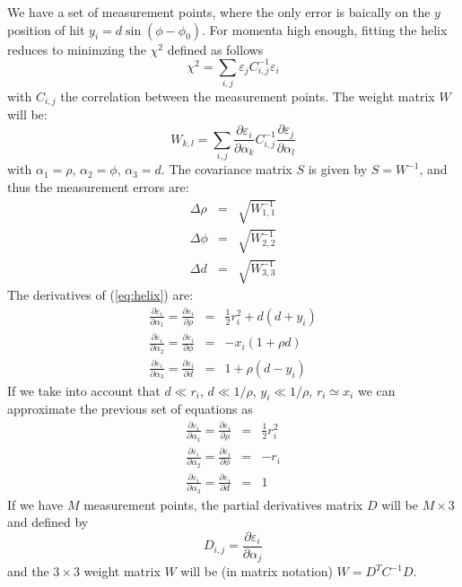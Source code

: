 \documentclass[10pt,a4paper]{article}
\begin{document}
We have a set of measurement points, where the only error is baically
on the $y$ position of hit $y_i = d \sin (\phi-\phi_0)$. For momenta
high enough, fitting the helix reduces to minimzing the $\chi^2$
defined as follows
\begin{equation}
  \chi^2 = \sum_{i,j} \varepsilon_j C^{-1}_{i,j} \varepsilon_i
\end{equation}
with $C_{i,j}$ the correlation between the measurement points. The
weight matrix $W$ will be:
\begin{equation}
  W_{k,l} = \sum_{i,j} \frac { \partial \varepsilon_i} {\partial \alpha_k} C^{-1}_{i,j}  \frac { \partial \varepsilon_j} {\partial \alpha_l}
\end{equation}
with $\alpha_1 = \rho$, $\alpha_2 = \phi$, $\alpha_3 = d$. The
covariance matrix $S$ is given by $S=W^{-1}$, and thus the measurement
errors are:
\begin{eqnarray}
\Delta \rho &=& \sqrt{W_{1,1}^{-1}} \nonumber \\
\Delta \phi &=& \sqrt{W_{2,2}^{-1}} \nonumber \\
\Delta d &=& \sqrt{W_{3,3}^{-1}} \nonumber
\end{eqnarray}
The derivatives of (\ref{eq:helix}) are:
\begin{eqnarray}
  \frac { \partial \varepsilon_i} {\partial \alpha_1} =
  \frac { \partial \varepsilon_i} {\partial \rho} &=& \frac 1 2 r_i^2 + d (d+y_i) \nonumber \\
  \frac { \partial \varepsilon_i} {\partial \alpha_2} =
  \frac { \partial \varepsilon_i} {\partial \phi} &=& - x_i (1+\rho d) \nonumber \\
  \frac { \partial \varepsilon_i} {\partial \alpha_3} =
  \frac { \partial \varepsilon_i} {\partial d} &=& 1 + \rho (d - y_i) \nonumber 
\end{eqnarray}
If we take into account that $d \ll r_i$, $d \ll 1/\rho$, $y_i \ll
1/\rho$, $r_i \simeq x_i$ we can approximate the previous set of
equations as
\begin{eqnarray}
\frac { \partial \varepsilon_i} {\partial \alpha_1} =
\frac { \partial \varepsilon_i} {\partial \rho} &=& \frac 1 2 r_i^2 \nonumber \\
\frac { \partial \varepsilon_i} {\partial \alpha_2} =
\frac { \partial \varepsilon_i} {\partial \phi} &=& - r_i  \nonumber \\
\frac { \partial \varepsilon_i} {\partial \alpha_3} =
\frac { \partial \varepsilon_i} {\partial d} &=& 1 \nonumber 
\end{eqnarray}
If we have $M$ measurement points, the partial derivatives matrix $D$
will be $M\times 3$ and defined by
\begin{equation}
  D_{i,j} = \frac { \partial \varepsilon_i} {\partial \alpha_j}
\end{equation}
and the $3\times 3$ weight matrix $W$ will be (in matrix notation)
$W=D^{T}C^{-1}D$.
\end{document}
